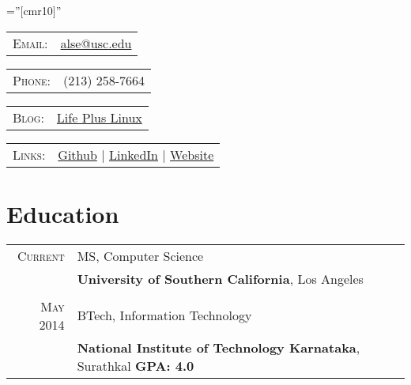 \documentclass[a4paper,10pt]{article} %
\begin{document}
\pagestyle{empty} %

\font\fb=''[cmr10]'' %


{\par} %
\begin{tabular}{rl}
\textsc{Email:} & \href{mailto:alse@usc.edu}{alse@usc.edu}\\
\end{tabular}
\hfill
\begin{tabular}{rl}
\textsc{Phone:} & (213) 258-7664\\
\end{tabular}
\hfill
\begin{tabular}{rl}
\textsc{Blog:} & \href{http://lifepluslinux.blogspot.in}{Life Plus Linux}
\end{tabular}

\begin{tabular}{rl}
\textsc{Links:} & \href{http://github.com/alseambusher}{Github} | \href{http://in.linkedin.com/pub/suresh-alse/4a/956/682}{LinkedIn} | \href{http://alseambusher.github.io}{Website} 
\end{tabular}


\section{Education}
\begin{tabular}{rl}	

\textsc{Current} & MS, Computer Science\\
&\textbf{University of Southern California}, Los Angeles\\
\\
\textsc{May} 2014 & BTech, Information Technology\\
&\textbf{National Institute of Technology Karnataka}, Surathkal \hspace{2cm} \textbf{GPA: 4.0}

\end{tabular}
\end{document}
